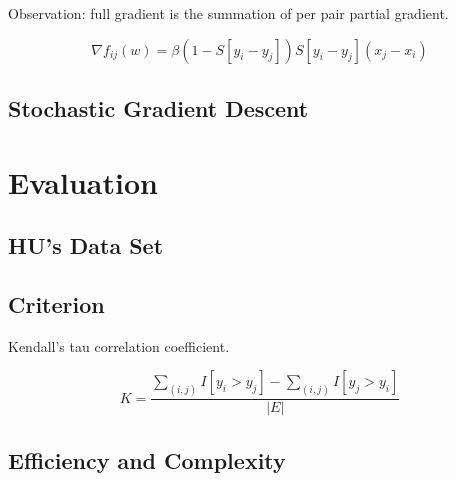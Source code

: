 \documentclass{sig-alternate}
\begin{document}
Observation: full gradient is the summation of
per pair partial gradient. 

\begin{equation}
	\nabla f_{ij}(w) = \beta (1-S[y_i - y_j])S[y_i-y_j](x_j-x_i)
\end{equation}

\subsection{Stochastic Gradient Descent}
\label{sec:Stochastic Gradient Descent}


\section{Evaluation}
\label{sec:Evaluation}

\subsection{HU's Data Set}
\label{sec:HU's Data Set}

\subsection{Criterion}
\label{sec:Criterion}

Kendall's tau correlation coefficient. 

\begin{equation}
	K = \frac{\sum_{(i,j)}{I[y_i>y_j]} - \sum_{(i,j)}{I[y_j>y_i]}}{|E|}
\end{equation}

\subsection{Efficiency and Complexity}
\label{sec:Efficiency and Complexity}
\end{document}
